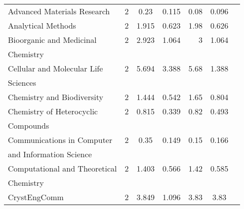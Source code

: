 \begin{longtable}[c]{lcccrcc}
 Advanced Materials Research                                                        & 2      & 0.23    & 0.115 &  0.08      & 0.096                 \\[0.5ex]
 Analytical Methods                                                                 & 2      & 1.915   & 0.623 &  1.98      & 0.626                 \\[0.5ex]
 Bioorganic and Medicinal                                                           & 2      & 2.923   & 1.064 &  3         & 1.064                 \\[0.5ex]
 Chemistry                                                                          &        &         &       &            &                       \\[0.5ex]
 Cellular and Molecular Life                                                        & 2      & 5.694   & 3.388 &  5.68      & 1.388                 \\[0.5ex]
 Sciences                                                                           &        &         &       &            &                       \\[0.5ex]
 Chemistry and Biodiversity                                                         & 2      & 1.444   & 0.542 &  1.65      & 0.804                 \\[0.5ex]
 Chemistry of Heterocyclic                                                          & 2      & 0.815   & 0.339 &  0.82      & 0.493                 \\[0.5ex]
 Compounds                                                                          &        &         &       &            &                       \\[0.5ex]
 Communications in Computer                                                         & 2      & 0.35    & 0.149 &  0.15      & 0.166                 \\[0.5ex]
 and Information Science                                                            &        &         &       &            &                       \\[0.5ex]
 Computational and Theoretical                                                      & 2      & 1.403   & 0.566 &  1.42      & 0.585                 \\[0.5ex]
 Chemistry                                                                          &        &         &       &            &                       \\[0.5ex]
 CrystEngComm                                                                       & 2      & 3.849   & 1.096 &  3.83      & 3.83                  \\[0.5ex]

\end{longtable}
